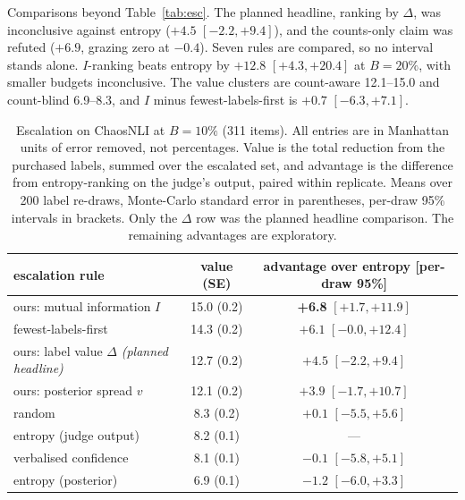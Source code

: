 \documentclass{article}
\begin{document}
Comparisons beyond Table~\ref{tab:esc}. The planned headline, ranking by
$\Delta$, was inconclusive against entropy ($+4.5$ $[-2.2, +9.4]$), and the
counts-only claim was refuted ($+6.9$, grazing zero at $-0.4$). Seven rules are
compared, so no interval stands alone. $I$-ranking beats entropy by $+12.8$
$[+4.3, +20.4]$ at $B=20\%$, with smaller budgets inconclusive. The value
clusters are count-aware 12.1--15.0 and count-blind 6.9--8.3, and $I$ minus
fewest-labels-first is $+0.7$ $[-6.3, +7.1]$.

\begin{table}[h]
  \caption{Escalation on ChaosNLI at $B=10\%$ (311 items). All entries are in Manhattan
    units of error removed, not percentages. Value is the total reduction
    from the purchased labels, summed over the
    escalated set, and advantage is the difference from entropy-ranking on the judge's output,
    paired within replicate. Means over 200 label re-draws, Monte-Carlo standard error in
    parentheses, per-draw 95\% intervals in brackets. Only the $\Delta$ row was the planned
    headline comparison. The remaining advantages are exploratory.}
  \label{tab:escalation}
  \centering
  \small
  \begin{tabular}{lcc}
    \toprule
    escalation rule & value (SE) & advantage over entropy [per-draw 95\%] \\
    \midrule
    ours: mutual information $I$ & 15.0 (0.2) & \textbf{+6.8} $[+1.7, +11.9]$ \\
    fewest-labels-first & 14.3 (0.2) & $+6.1$ $[-0.0, +12.4]$ \\
    ours: label value $\Delta$ \emph{(planned headline)} & 12.7 (0.2)
      & $+4.5$ $[-2.2, +9.4]$ \\
    ours: posterior spread $v$ & 12.1 (0.2) & $+3.9$ $[-1.7, +10.7]$ \\
    random & 8.3 (0.2) & $+0.1$ $[-5.5, +5.6]$ \\
    entropy (judge output) & 8.2 (0.1) & --- \\
    verbalised confidence & 8.1 (0.1) & $-0.1$ $[-5.8, +5.1]$ \\
    entropy (posterior) & 6.9 (0.1) & $-1.2$ $[-6.0, +3.3]$ \\
    \bottomrule
  \end{tabular}
\end{table}
\end{document}

